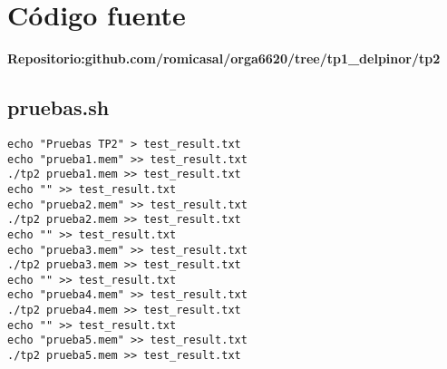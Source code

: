 \documentclass[a4paper, 10pt, twoside, notitlepage]{article}
\begin{document}
\newpage
\section{Código fuente}
\normalsize
\textbf{Repositorio:github.com/romicasal/orga6620/tree/tp1\_delpinor/tp2}
\subsection{pruebas.sh}
\begin{lstlisting}
echo "Pruebas TP2" > test_result.txt
echo "prueba1.mem" >> test_result.txt
./tp2 prueba1.mem >> test_result.txt
echo "" >> test_result.txt
echo "prueba2.mem" >> test_result.txt
./tp2 prueba2.mem >> test_result.txt
echo "" >> test_result.txt
echo "prueba3.mem" >> test_result.txt
./tp2 prueba3.mem >> test_result.txt
echo "" >> test_result.txt
echo "prueba4.mem" >> test_result.txt
./tp2 prueba4.mem >> test_result.txt
echo "" >> test_result.txt
echo "prueba5.mem" >> test_result.txt
./tp2 prueba5.mem >> test_result.txt

\end{lstlisting}
\end{document}

